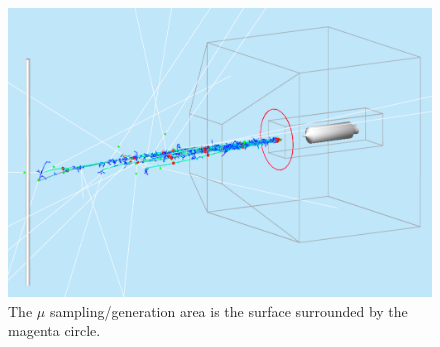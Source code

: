 \begin{figure}[h!] 
\center
\includegraphics[width=12cm]{figs/mu-gen.pdf}   
\caption{The  $\mu$ sampling/generation area is the surface surrounded by  the magenta circle.}
\label{fig:mu-gen}
\end{figure}



